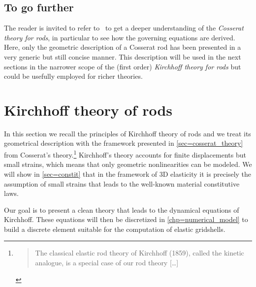 \subsection{To go further}

The reader is invited to refer to~\cite{Antman2005} to get a deeper understanding of the \emph{Cosserat theory for rods}, in particular to see how the governing equations are derived. Here, only the geometric description of a Cosserat rod has been presented in a very generic but still concise manner. This description will be used in the next sections in the narrower scope of the (first order) \emph{Kirchhoff theory for rods} but could be usefully employed for richer theories.

\section{Kirchhoff theory of rods}\label{sec=kirchhoff_theory}

In this section we recall the principles of Kirchhoff theory of rods and we treat its geometrical description with the framework presented in \cref{sec=cosserat_theory} from Cosserat's theory.\footnote{\blockcquote[p.~238]{Antman2005}{The classical elastic rod theory of Kirchhoff (1859), called the kinetic analogue, is a special case of our rod theory [\dots]}.} Kirchhoff's theory accounts for finite displacements but small strains, which means that only geometric nonlinearities can be modeled. We will show in \cref{sec=constit} that in the framework of 3D elasticity it is precisely the assumption of small strains that leads to the well-known material constitutive laws.

Our goal is to present a clean theory that leads to the dynamical equations of Kirchhoff. These equations will then be discretized in \cref{chp=numerical_model} to build a discrete element suitable for the computation of elastic gridshells.


